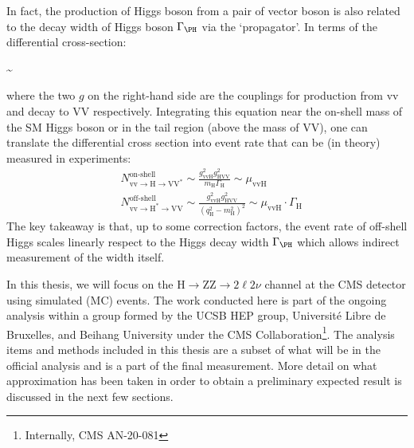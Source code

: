 In fact, the production of Higgs boson from a pair of vector boson is also related to the
decay width of Higgs boson $\Gamma_\text{\PH}$ via the `propagator'\cite{offshell_poc}. In terms of the
differential cross-section:

\be
\label{eqn:diff_xsec}
\sim 
{}
\ee

where the two $g$ on the right-hand side are the couplings for production from vv and decay
to VV respectively. Integrating this equation near the on-shell mass of the SM Higgs boson 
or in the tail region (above the mass of VV), one can translate the differential cross section
into event rate that can be (in theory) measured in experiments:
\begin{equation}
\begin{split}
&N_{\mathrm{vv} \rightarrow \mathrm{H} \rightarrow \mathrm{VV}^{*}}^{\text{on-shell}} \sim \frac{g_{\mathrm{vvH}}^{2} g_{\mathrm{HVV}}^{2}}{m_{\mathrm{H}} \Gamma_{\mathrm{H}}} \sim \mu_{\mathrm{vvH}}
\\
&N_{\mathrm{vv} \rightarrow \mathrm{H}^{*} \rightarrow \mathrm{VV}}^{\text{off-shell}} \sim \frac{g_{\mathrm{vvH}}^{2} g_{\mathrm{HVV}}^{2}}{\left(q_{\mathrm{H}}^{2}-m_{\mathrm{H}}^{2}\right)^{2}} \sim \mu_{\mathrm{vvH}} \cdot \Gamma_{\mathrm{H}}
\end{split}
\end{equation}
The key takeaway is that, up to some correction factors, the event rate of off-shell Higgs scales
linearly respect to the Higgs decay width $\Gamma_\text{\PH}$ which allows indirect
measurement of the width itself.

In this thesis, we will focus on the $\mathrm{H} \rightarrow \mathrm{ZZ} \rightarrow 2\ell2\nu$ channel
at the CMS detector using simulated (MC) events. The work conducted here is part of the ongoing analysis
within a group formed by the UCSB HEP group, Universit\'e Libre de Bruxelles, and Beihang University under
the CMS Collaboration\footnote{Internally, CMS AN-20-081}. The analysis items and methods included in this
thesis are a subset of what will be in the official analysis and is a part of the final measurement. More
detail on what approximation has been taken in order to obtain a preliminary expected result is discussed
in the next few sections.

